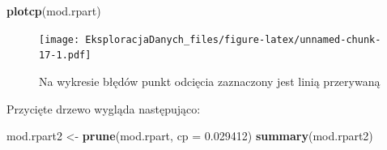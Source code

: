 \documentclass[]{book}
\newenvironment{Shaded}{\begin{snugshade}}{\end{snugshade}}
\newcommand{\DataTypeTok}[1]{\textcolor[rgb]{0.13,0.29,0.53}{#1}}
\newcommand{\FloatTok}[1]{\textcolor[rgb]{0.00,0.00,0.81}{#1}}
\newcommand{\KeywordTok}[1]{\textcolor[rgb]{0.13,0.29,0.53}{\textbf{#1}}}
\newcommand{\NormalTok}[1]{#1}
\newcommand{\StringTok}[1]{\textcolor[rgb]{0.31,0.60,0.02}{#1}}
\theoremstyle{plain}
\theoremstyle{definition}
\begin{document}
\begin{Shaded}
\begin{Highlighting}[]
\KeywordTok{plotcp}\NormalTok{(mod.rpart)}
\end{Highlighting}
\end{Shaded}

\begin{figure}
\centering
\texttt{[image: EksploracjaDanych\_files/figure-latex/unnamed-chunk-17-1.pdf]}
\caption{\label{fig:unnamed-chunk-17}Na wykresie błędów punkt odcięcia zaznaczony jest linią przerywaną}
\end{figure}

Przycięte drzewo wygląda następująco:

\begin{Shaded}
\begin{Highlighting}[]
\NormalTok{mod.rpart2 <-}\StringTok{ }\KeywordTok{prune}\NormalTok{(mod.rpart, }\DataTypeTok{cp =} \FloatTok{0.029412}\NormalTok{)}
\KeywordTok{summary}\NormalTok{(mod.rpart2)}
\end{Highlighting}
\end{Shaded}
\end{document}
